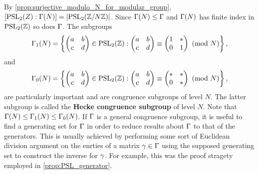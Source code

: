         By \cref{prop:surjective_modulo_N_for_modular_group}, $[\mathrm{PSL}_{2}(Z):\Gamma(N)] = |\mathrm{PSL}_{2}(\mathbb{Z}/N\mathbb{Z})|$. Since $\Gamma(N) \le \Gamma$ and $\Gamma(N)$ has finite index in $\mathrm{PSL}_{2}(\mathbb{Z})$ so does $\Gamma$. The subgroups
      \[
        \Gamma_{1}(N) = \left\{\begin{pmatrix} a & b \\ c & d \end{pmatrix} \in \mathrm{PSL}_{2}(\mathbb{Z}):\begin{pmatrix} a & b \\ c & d \end{pmatrix} \equiv \begin{pmatrix} 1 & \ast \\ 0 & 1 \end{pmatrix} \ \left(\text{mod }N\right)\right\},
      \]
      and
      \[
        \Gamma_{0}(N) = \left\{\begin{pmatrix} a & b \\ c & d \end{pmatrix} \in \mathrm{PSL}_{2}(\mathbb{Z}):\begin{pmatrix} a & b \\ c & d \end{pmatrix} \equiv \begin{pmatrix} \ast & \ast \\ 0 & \ast \end{pmatrix} \ \left(\text{mod }N\right)\right\},
      \]
      are particularly important and are congruence subgroups of level $N$. The latter subgroup is called the \textbf{Hecke congruence subgroup} of level $N$. Note that $\Gamma(N) \le \Gamma_{1}(N) \le \Gamma_{0}(N)$. If $\Gamma$ is a general congruence subgroup, it is useful to find a generating set for $\Gamma$ in order to reduce results about $\Gamma$ to that of the generators. This is usually achieved by performing some sort of Euclidean division argument on the enrties of a matrix $\gamma \in \Gamma$ using the supposed generating set to construct the inverse for $\gamma$. For example, this was the proof stragety employed in \cref{prop:PSL_generator}.

